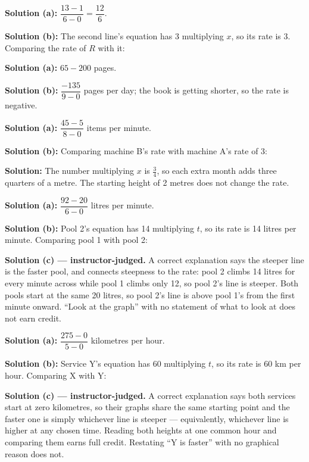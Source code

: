 \documentclass[12pt]{article}
\begin{document}
\textbf{Solution (a):} $\dfrac{13 - 1}{6 - 0} = \dfrac{12}{6}$. 

\textbf{Solution (b):} The second line's equation has 3 multiplying $x$, so
its rate is 3. Comparing the rate of $R$ with it: 


\textbf{Solution (a):} $65 - 200$ pages. 

\textbf{Solution (b):} $\dfrac{-135}{9 - 0}$ pages per day; the book is
getting shorter, so the rate is negative. 


\textbf{Solution (a):} $\dfrac{45 - 5}{8 - 0}$ items per minute. 

\textbf{Solution (b):} Comparing machine B's rate with machine A's rate of 3:


\textbf{Solution:} The number multiplying $x$ is $\frac{3}{4}$, so each extra
month adds three quarters of a metre. The starting height of 2 metres does not
change the rate. 


\textbf{Solution (a):} $\dfrac{92 - 20}{6 - 0}$ litres per minute.

\textbf{Solution (b):} Pool 2's equation has 14 multiplying $t$, so its rate
is 14 litres per minute. Comparing pool 1 with pool 2: 

\textbf{Solution (c) --- instructor-judged.} A correct explanation says the
steeper line is the faster pool, and connects steepness to the rate: pool 2
climbs 14 litres for every minute across while pool 1 climbs only 12, so pool
2's line is steeper. Both pools start at the same 20 litres, so pool 2's line
is above pool 1's from the first minute onward. ``Look at the graph'' with no
statement of what to look at does not earn credit.


\textbf{Solution (a):} $\dfrac{275 - 0}{5 - 0}$ kilometres per hour.

\textbf{Solution (b):} Service Y's equation has 60 multiplying $t$, so its
rate is 60 km per hour. Comparing X with Y: 

\textbf{Solution (c) --- instructor-judged.} A correct explanation says both
services start at zero kilometres, so their graphs share the same starting
point and the faster one is simply whichever line is steeper --- equivalently,
whichever line is higher at any chosen time. Reading both heights at one
common hour and comparing them earns full credit. Restating ``Y is faster''
with no graphical reason does not.
\end{document}
